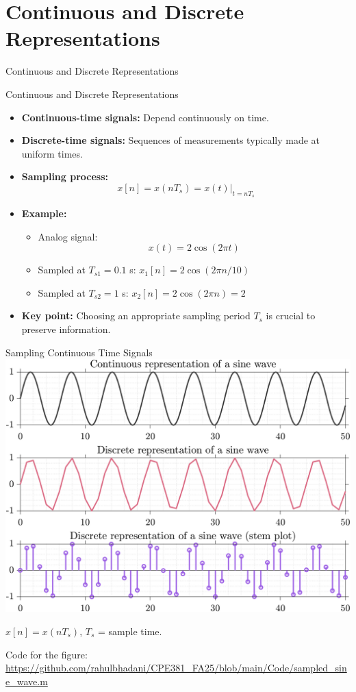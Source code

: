 \documentclass[aspectratio=169,xcolor=dvipsnames,svgnames,x11names,fleqn]{beamer}
\begin{document}
\section{Continuous and Discrete Representations}

\begin{frame}{}
    \begin{center}
    \Huge \bf \color{DarkBlue}
    \faFire
    
Continuous and Discrete Representations
\end{center}
\end{frame}

\begin{frame}{Continuous and Discrete Representations}
    \begin{itemize}
        \item \textbf{Continuous-time signals:} Depend continuously on time.
        \item \textbf{Discrete-time signals:} Sequences of measurements typically made at uniform times.
        \item \textbf{Sampling process:} 
        \begin{equation*}
            x[n] = x(nT_s) = x(t)|_{t=nT_s}
        \end{equation*}
        \item \textbf{Example:} 
        \begin{itemize}
            \item Analog signal: $$ x(t) = 2 \cos(2\pi t) $$
            \item Sampled at $ T_{s1} = 0.1 $ s: $ x_1[n] = 2 \cos(2\pi n/10) $
            \item Sampled at $ T_{s2} = 1 $ s: $ x_2[n] = 2 \cos(2\pi n) = 2 $
        \end{itemize}
        \item \textbf{Key point:} Choosing an appropriate sampling period \( T_s \) is crucial to preserve information.
    \end{itemize}
\end{frame}
\begin{frame}{Sampling Continuous Time Signals}
    \centering
    \includegraphics[width=0.45\linewidth, trim=0 0 0 0cm,clip]{figures/sampled_sine_wave.png} 
    
    $x[n] = x(nT_s)$,
$T_s$ = sample time.
    
    \tiny
    Code for the figure: \url{https://github.com/rahulbhadani/CPE381_FA25/blob/main/Code/sampled_sine_wave.m}
\end{frame}
\end{document}
